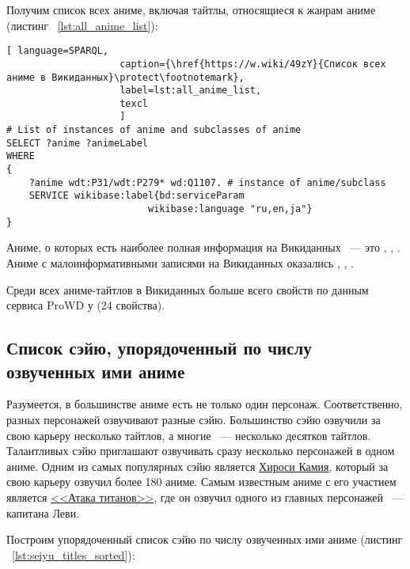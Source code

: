 Получим список всех аниме, включая тайтлы, относящиеся к жанрам аниме (листинг ~\protect\ref{lst:all_anime_list}):

\begin{lstlisting}[ language=SPARQL, 
                    caption={\href{https://w.wiki/49zY}{Список всех аниме в Викиданных}\protect\footnotemark},
                    label=lst:all_anime_list,
                    texcl 
                    ]
# List of instances of anime and subclasses of anime
SELECT ?anime ?animeLabel
WHERE
{
    ?anime wdt:P31/wdt:P279* wd:Q1107. # instance of anime/subclass
    SERVICE wikibase:label{bd:serviceParam
					     wikibase:language "ru,en,ja"}
}
\end{lstlisting}%

Аниме, о которых есть наиболее полная информация на Викиданных ~--- это , , . Аниме с малоинформативными записями на Викиданных оказались , , .

Среди всех аниме-тайтлов в Викиданных больше всего свойств по данным сервиса ProWD\cite{anime_prowd} у  (24 свойства).

\subsection{Список сэйю, упорядоченный по числу озвученных ими аниме}

Разумеется, в большинстве аниме есть не только один персонаж. Соответственно, разных персонажей озвучивают разные сэйю. Большинство сэйю озвучили за свою карьеру несколько тайтлов, а многие ~--- несколько десятков тайтлов. Талантливых сэйю приглашают озвучивать сразу несколько персонажей в одном аниме. Одним из самых популярных сэйю является \href{https://clck.ru/YSCoP}{Хироси Камия}, который за свою карьеру озвучил более 180 аниме. Самым известным аниме с его участием является \href{https://clck.ru/YSCrG}{<<Атака титанов>>}, где он озвучил одного из главных персонажей ~--- капитана Леви.

Построим упорядоченный список сэйю по числу озвученных ими аниме (листинг ~\protect\ref{lst:seiyu_titles_sorted}): 

